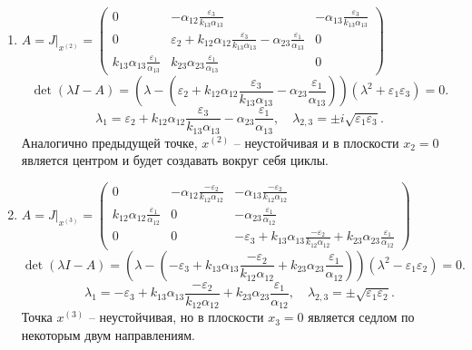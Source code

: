 \begin{enumerate}
        \item \(
            A = J \big|_{x^{(2)}} = \left(\begin{matrix}
                0 & -\alpha_{12} \frac{\varepsilon_3}{k_{13} \alpha_{13}} & -\alpha_{13} \frac{\varepsilon_3}{k_{13} \alpha_{13}} \\[10pt]
                0 & \varepsilon_2 + k_{12} \alpha_{12} \frac{\varepsilon_3}{k_{13} \alpha_{13}} - \alpha_{23}  \frac{\varepsilon_1}{\alpha_{13}} & 0 \\[10pt]
                k_{13} \alpha_{13} \frac{\varepsilon_1}{\alpha_{13}} & k_{23} \alpha_{23} \frac{\varepsilon_1}{\alpha_{13}}  & 0
            \end{matrix}\right)
        \)
        \[
            \det(\lambda I - A) = \left(\lambda - \left(\varepsilon_2 + k_{12} \alpha_{12} \frac{\varepsilon_3}{k_{13} \alpha_{13}} - \alpha_{23}  \frac{\varepsilon_1}{\alpha_{13}} \right) \right)(\lambda^2 + \varepsilon_1 \varepsilon_3) = 0.
        \]
        \[
            \lambda_1 = \varepsilon_2 + k_{12} \alpha_{12} \frac{\varepsilon_3}{k_{13} \alpha_{13}} - \alpha_{23}  \frac{\varepsilon_1}{\alpha_{13}}, \quad \lambda_{2,3} = \pm i \sqrt{\varepsilon_1 \varepsilon_3}.
        \]
        Аналогично предыдущей точке, \( x^{(2)} \) -- неустойчивая и в плоскости \( x_2 = 0 \) является центром и будет создавать вокруг себя циклы.

        \item \(
            A = J \big|_{x^{(3)}} = \left(\begin{matrix}
                0 & -\alpha_{12} \frac{-\varepsilon_2}{k_{12} \alpha_{12}} & -\alpha_{13} \frac{-\varepsilon_2}{k_{12} \alpha_{12}} \\[10pt]
                k_{12} \alpha_{12} \frac{\varepsilon_1}{\alpha_{12}} & 0 & -\alpha_{23} \frac{\varepsilon_1}{\alpha_{12}} \\[10pt]
                0 & 0 & -\varepsilon_3 + k_{13} \alpha_{13} \frac{-\varepsilon_2}{k_{12} \alpha_{12}} + k_{23} \alpha_{23} \frac{\varepsilon_1}{\alpha_{12}}
            \end{matrix}\right)
        \)
        \[
            \det(\lambda I - A) = \left(\lambda - \left(-\varepsilon_3 + k_{13} \alpha_{13} \frac{-\varepsilon_2}{k_{12} \alpha_{12}} + k_{23} \alpha_{23} \frac{\varepsilon_1}{\alpha_{12}} \right) \right)(\lambda^2 - \varepsilon_1 \varepsilon_2) = 0.
        \]
        \[
            \lambda_1 = -\varepsilon_3 + k_{13} \alpha_{13} \frac{-\varepsilon_2}{k_{12} \alpha_{12}} + k_{23} \alpha_{23} \frac{\varepsilon_1}{\alpha_{12}}, \quad \lambda_{2,3} = \pm \sqrt{\varepsilon_1 \varepsilon_2}.
        \]
        Точка \( x^{(3)} \) -- неустойчивая, но в плоскости \( x_3 = 0 \) является седлом по некоторым двум направлениям.


\end{enumerate}
